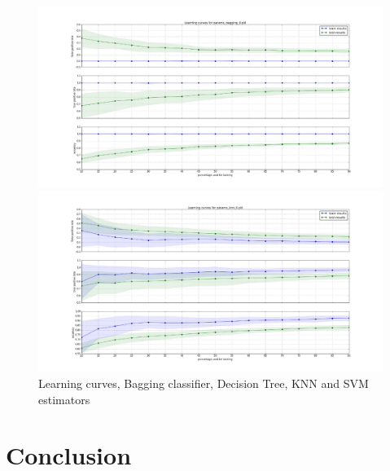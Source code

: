 \documentclass[10pt, conference, compsocconf]{IEEEtran}
\begin{document}
\begin{figure}[h]
\vskip 0.2in
\begin{center}
\centerline{\includegraphics[width=\columnwidth, scale=1]{./Figures/Lc_Ds5_P50-50_BaD}}
\centerline{\includegraphics[width=\columnwidth, scale=1]{./Figures/Lc_Ds5_P50-50_Bak}}
\caption{Learning curves, Bagging classifier, Decision Tree, KNN and SVM estimators}
\label{learning curves}
\end{center}
\vskip -0.2in
\end{figure}


\section{Conclusion} \label{Conclusion}







\end{document}
